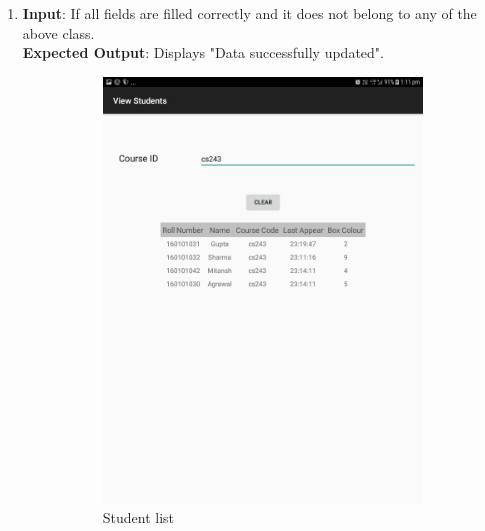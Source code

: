 \documentclass{scrreprt}
\begin{document}
\begin{itemize}
\begin{enumerate}
\item \textbf{Input}: If all fields are filled correctly and it does not belong to any of the above class.\\
\textbf{Expected Output}: Displays "Data successfully updated".
\begin{figure}[H]
\begin{subfigure}{0.5\textwidth}
\includegraphics[width=0.85\linewidth, keepaspectratio]{viewdone.jpg} 
\caption{Student list}
\label{fig:subim1}
\end{subfigure}
\begin{subfigure}{0.5\textwidth}

\end{subfigure}
\end{figure}
\end{enumerate}
\end{itemize}
\end{document}
